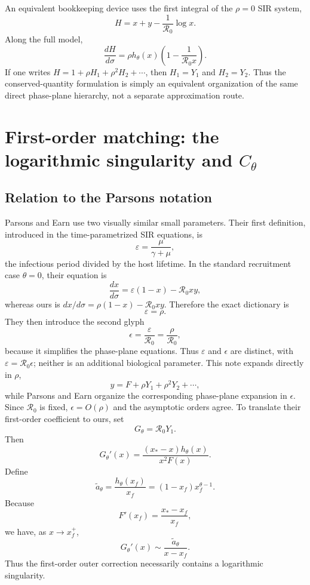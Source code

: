 \documentclass[11pt,a4paper]{article}
\newcommand{\Rzero}{\mathcal R_0}
\newcommand{\xf}{x_f}
\newcommand{\xs}{x_*}
\begin{document}
An equivalent bookkeeping device uses the first integral of the $\rho=0$ SIR system,
\[
H=x+y-\frac1{\Rzero}\log x.
\]
Along the full model,
\[
\frac{dH}{d\sigma}
=\rho h_\theta(x)\left(1-\frac1{\Rzero x}\right).
\]
If one writes $H=1+\rho H_1+\rho^2H_2+\cdots$, then $H_1=Y_1$ and $H_2=Y_2$. Thus the conserved-quantity formulation is simply an equivalent organization of the same direct phase-plane hierarchy, not a separate approximation route.

\section{First-order matching: the logarithmic singularity and $C_\theta$}
\subsection{Relation to the Parsons notation}
Parsons and Earn use two visually similar small parameters.  Their first
definition, introduced in the time-parametrized SIR equations, is
\[
\varepsilon=\frac{\mu}{\gamma+\mu},
\]
the infectious period divided by the host lifetime.  In the standard
recruitment case $\theta=0$, their equation is
\[
 \frac{dx}{d\sigma}=\varepsilon(1-x)-\Rzero xy,
\]
whereas ours is $dx/d\sigma=\rho(1-x)-\Rzero xy$.  Therefore the exact
dictionary is
\begin{equation}
 \boxed{\varepsilon=\rho.}
 \label{eq:eps-vareps-map}
\end{equation}
They then introduce the second glyph
\begin{equation}
 \boxed{\epsilon=\frac{\varepsilon}{\Rzero}
 =\frac{\rho}{\Rzero},}
 \label{eq:eps-map}
\end{equation}
because it simplifies the phase-plane equations.  Thus $\varepsilon$ and
$\epsilon$ are distinct, with $\varepsilon=\Rzero\epsilon$; neither is an
additional biological parameter.  This note expands directly in $\rho$,
\[
 y=F+\rho Y_1+\rho^2Y_2+\cdots,
\]
while Parsons and Earn organize the corresponding phase-plane expansion in
$\epsilon$.  Since $\Rzero$ is fixed, $\epsilon=O(\rho)$ and the asymptotic
orders agree.  To translate their first-order coefficient to ours, set
\begin{equation}
\label{eq:G-Y1}
G_\theta=\Rzero Y_1.
\end{equation}
Then
\begin{equation}
\label{eq:Gprime}
G_\theta'(x)
=\frac{(\xs-x)h_\theta(x)}{x^2F(x)}.
\end{equation}
Define
\begin{equation}
\label{eq:atilde}
\widetilde a_\theta
=\frac{h_\theta(\xf)}{\xf}
=(1-\xf)\xf^{\theta-1}.
\end{equation}
Because
\[
F'(\xf)=\frac{\xs-\xf}{\xf},
\]
we have, as $x\to\xf^+$,
\[
G_\theta'(x)\sim\frac{\widetilde a_\theta}{x-\xf}.
\]
Thus the first-order outer correction necessarily contains a logarithmic singularity.
\end{document}
